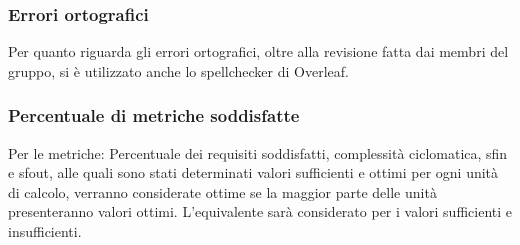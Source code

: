 \subsubsection{Errori ortografici}

Per quanto riguarda gli errori ortografici, oltre alla revisione fatta dai membri del gruppo, si è utilizzato anche lo spellchecker di Overleaf.

\newpage
\subsubsection{Percentuale di metriche soddisfatte}
    Per le metriche: Percentuale dei requisiti soddisfatti, complessità ciclomatica, sfin e sfout, alle quali sono stati determinati valori sufficienti e ottimi per ogni unità di calcolo,
    verranno considerate ottime se la maggior parte delle unità presenteranno valori ottimi. L'equivalente
    sarà considerato per i valori sufficienti e insufficienti. 


